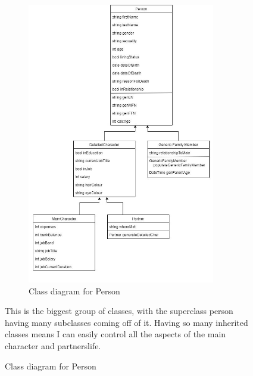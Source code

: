 \begin{figure} [H]
    \centering
    \begin{minipage}{0.65\textwidth}
        \begin{figure}[H]
        \centering
        \includegraphics[width=0.9\textwidth]{images/design/class-person.jpg}
        \caption{Class diagram for Person}
        \label{fig:design-class-person}
        \end{figure}
    \end{minipage} \hfill
    \begin{minipage}{0.25\textwidth}
        This is the biggest group of classes, with the superclass person having many subclasses coming off of it. Having so many inherited classes means I can easily control all the aspects of the main character and partners\textquotesingle  life.
    \end{minipage}
\end{figure}

